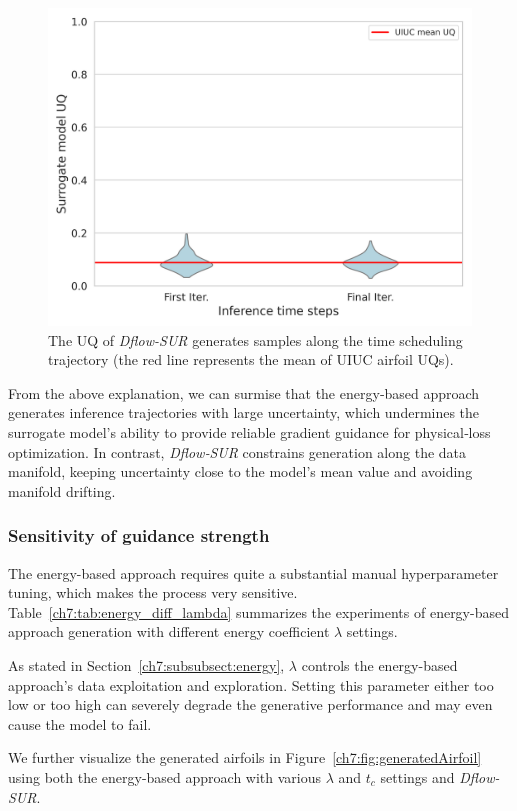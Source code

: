 \begin{figure}[!tbp]
    \centering
    \includegraphics[width=0.8\linewidth]{chapter7/fig/dflow_uncertainty_violin.png}
    \caption{The UQ of \textit{Dflow-SUR} generates samples along the time scheduling trajectory (the red line represents the mean of UIUC airfoil UQs).}
    \label{ch7:fig:uqDflowSUR}
\end{figure}

From the above explanation, we can surmise that the energy‐based approach generates inference trajectories with large uncertainty, which undermines the surrogate model’s ability to provide reliable gradient guidance for physical‐loss optimization. In contrast, \textit{Dflow‐SUR} constrains generation along the data manifold, keeping uncertainty close to the model's mean value and avoiding manifold drifting.

\subsubsection{Sensitivity of guidance strength}
\label{ch7:subsect:diversity}
The energy-based approach requires quite a substantial manual hyperparameter tuning, which makes the process very sensitive. Table~\ref{ch7:tab:energy_diff_lambda} summarizes the experiments of energy-based approach generation with different energy coefficient $\lambda$ settings.  

As stated in Section~\ref{ch7:subsubsect:energy}, $\lambda$ controls the energy-based approach's data exploitation and exploration. Setting this parameter either too low or too high can severely degrade the generative performance and may even cause the model to fail.

We further visualize the generated airfoils in Figure~\ref{ch7:fig:generatedAirfoil} using both the energy-based approach with various $\lambda$ and $t_c$ settings and \textit{Dflow-SUR}. 

